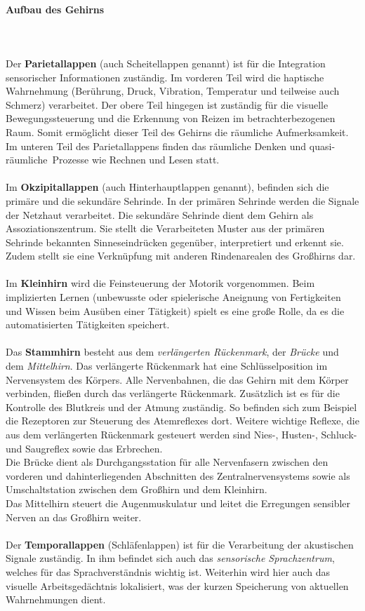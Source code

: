 \paragraph{Aufbau des Gehirns}~\\
\\
Der {\bf Parietallappen} (auch Scheitellappen genannt) ist für die Integration sensorischer Informationen zuständig. Im vorderen Teil wird die haptische Wahrnehmung (Berührung, Druck, Vibration, Temperatur und teilweise auch Schmerz) verarbeitet. Der obere Teil hingegen ist zuständig für die visuelle Bewegungssteuerung und die Erkennung von Reizen im betrachterbezogenen Raum. Somit ermöglicht dieser Teil des Gehirns die räumliche Aufmerksamkeit. Im unteren Teil des Parietallappens finden das räumliche Denken und \ql quasi-räumliche\qr\ Prozesse wie Rechnen und Lesen statt.\\
\\
Im {\bf Okzipitallappen} (auch Hinterhauptlappen genannt), befinden sich die primäre und die sekundäre Sehrinde. In der primären Sehrinde werden die Signale der Netzhaut verarbeitet. Die sekundäre Sehrinde dient dem Gehirn als Assoziationszentrum. Sie stellt die Verarbeiteten Muster aus der primären Sehrinde bekannten Sinneseindrücken gegenüber, interpretiert und erkennt sie. Zudem stellt sie eine Verknüpfung mit anderen Rindenarealen des Großhirns dar.\\
\\
Im {\bf Kleinhirn} wird die Feinsteuerung der Motorik vorgenommen. Beim implizierten Lernen (unbewusste oder spielerische Aneignung von Fertigkeiten und Wissen beim Ausüben einer Tätigkeit) spielt es eine große Rolle, da es die automatisierten Tätigkeiten speichert.\\
\\
Das {\bf Stammhirn} besteht aus dem {\it verlängerten Rückenmark}, der {\it Brücke} und dem {\it Mittelhirn}. Das verlängerte Rückenmark hat eine Schlüsselposition im Nervensystem des Körpers. Alle Nervenbahnen, die das Gehirn mit dem Körper verbinden, fließen durch das verlängerte Rückenmark. Zusätzlich ist es für die Kontrolle des Blutkreis und der Atmung zuständig. So befinden sich zum Beispiel die Rezeptoren zur Steuerung des Atemreflexes dort. Weitere wichtige Reflexe, die aus dem verlängerten Rückenmark gesteuert werden sind Nies-, Husten-, Schluck- und Saugreflex sowie das Erbrechen. \\
Die Brücke dient als Durchgangsstation für alle Nervenfasern zwischen den vorderen und dahinterliegenden Abschnitten des Zentralnervensystems sowie als Umschaltstation zwischen dem Großhirn und dem Kleinhirn.\\
Das Mittelhirn steuert die Augenmuskulatur und leitet die Erregungen sensibler Nerven an das Großhirn weiter.\\
\\
Der {\bf Temporallappen} (Schläfenlappen) ist für die Verarbeitung der akustischen Signale zuständig. In ihm befindet sich auch das {\it sensorische Sprachzentrum}, welches für das Sprachverständnis wichtig ist. Weiterhin wird hier auch das visuelle Arbeitsgedächtnis lokalisiert, was der kurzen Speicherung von aktuellen Wahrnehmungen dient.

